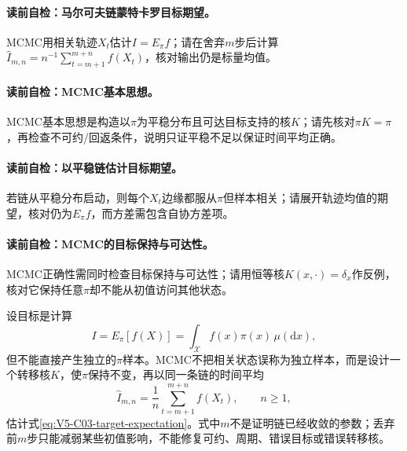 \paragraph{读前自检：马尔可夫链蒙特卡罗目标期望。}MCMC用相关轨迹$X_t$估计$I=E_\pi f$；请在舍弃$m$步后计算$\widehat I_{m,n}=n^{-1}\sum_{t=m+1}^{m+n}f(X_t)$，核对输出仍是标量均值。\par
\paragraph{读前自检：MCMC基本思想。}MCMC基本思想是构造以$\pi$为平稳分布且可达目标支持的核$K$；请先核对$\pi K=\pi$，再检查不可约/回返条件，说明只证平稳不足以保证时间平均正确。\par
\paragraph{读前自检：以平稳链估计目标期望。}若链从平稳分布启动，则每个$X_t$边缘都服从$\pi$但样本相关；请展开轨迹均值的期望，核对仍为$E_\pi f$，而方差需包含自协方差项。\par
\paragraph{读前自检：MCMC的目标保持与可达性。}MCMC正确性需同时检查目标保持与可达性；请用恒等核$K(x,\cdot)=\delta_x$作反例，核对它保持任意$\pi$却不能从初值访问其他状态。\par

\label{struct:V5-C03-CH06}
设目标是计算
\begin{equation}\label{eq:V5-C03-target-expectation}
I=E_\pi[f(X)]=\int_{\mathcal X}f(x)\pi(x)\,\mu(\mathrm dx),
\end{equation}
但不能直接产生独立的$\pi$样本。MCMC不把相关状态误称为独立样本，而是设计一个转移核$K$，使$\pi$保持不变，再以同一条链的时间平均
\begin{equation}\label{eq:V5-C03-ergodic-average}
\widehat I_{m,n}
=\frac1n\sum_{t=m+1}^{m+n}f(X_t),\qquad n\ge1,
\end{equation}
估计式\eqref{eq:V5-C03-target-expectation}。式中$m$不是证明链已经收敛的参数；丢弃前$m$步只能减弱某些初值影响，不能修复可约、周期、错误目标或错误转移核。

